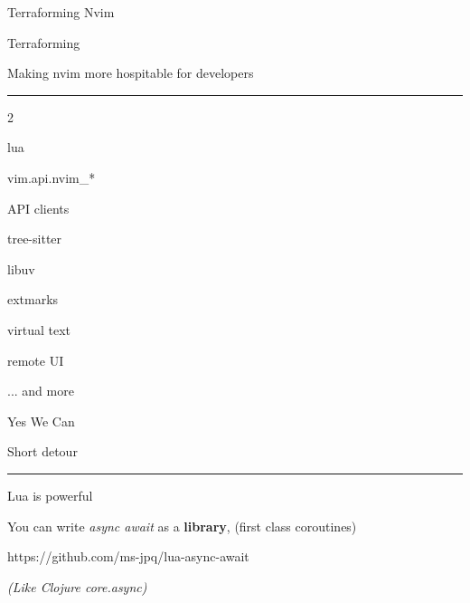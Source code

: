 \documentclass{beamer}
\begin{document}
\begin{frame}{Terraforming Nvim}

	\begin{block}{Terraforming}

		\vspace{0.5em}

		Making nvim more hospitable for developers

		\vspace{0.5em}

	\end{block}

	\rule{\textwidth}{0.1em}

	\begin{itemize}


	\end{itemize}

	... and more

\end{frame}


\begin{frame}{Yes We Can}

	Short detour

	\rule{\textwidth}{0.1em}

	Lua is powerful

	You can write \textit{async await} as a \textbf{library}, (first class coroutines)

	https://github.com/ms-jpq/lua-async-await

	\hspace{0.1em}

	\textit{(Like Clojure core.async)}

\end{frame}
\end{document}
